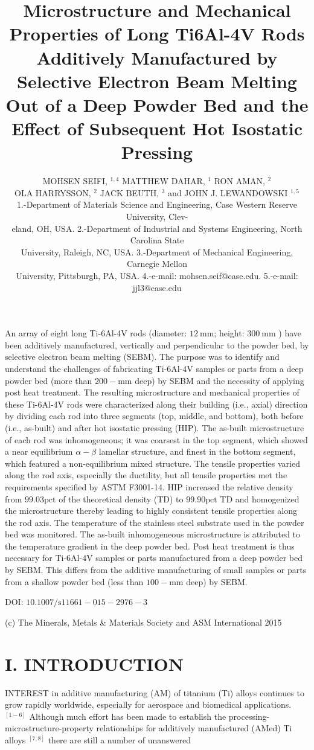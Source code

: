 \documentclass[10pt]{article}
\title{Microstructure and Mechanical Properties of Long Ti6Al-4V Rods Additively Manufactured by Selective Electron Beam Melting Out of a Deep Powder Bed and the Effect of Subsequent Hot Isostatic Pressing }
\author{MOHSEN SEIFI, ${ }^{1,4}$ MATTHEW DAHAR, ${ }^{1}$ RON AMAN, ${ }^{2}$\\
OLA HARRYSSON, ${ }^{2}$ JACK BEUTH, ${ }^{3}$ and JOHN J. LEWANDOWSKI ${ }^{1,5}$\\
1.-Department of Materials Science and Engineering, Case Western Reserve University, Clev-\\
eland, OH, USA. 2.-Department of Industrial and Systems Engineering, North Carolina State\\
University, Raleigh, NC, USA. 3.-Department of Mechanical Engineering, Carnegie Mellon\\
University, Pittsburgh, PA, USA. 4.-e-mail: mohsen.seif@case.edu. 5.-e-mail: jjl3@case.edu}
\date{}
\begin{document}
\maketitle
An array of eight long Ti-6Al-4V rods (diameter: $12 \mathrm{~mm}$; height: $300 \mathrm{~mm}$ ) have been additively manufactured, vertically and perpendicular to the powder bed, by selective electron beam melting (SEBM). The purpose was to identify and understand the challenges of fabricating Ti-6Al-4V samples or parts from a deep powder bed (more than $200-\mathrm{mm}$ deep) by SEBM and the necessity of applying post heat treatment. The resulting microstructure and mechanical properties of these Ti-6Al-4V rods were characterized along their building (i.e., axial) direction by dividing each rod into three segments (top, middle, and bottom), both before (i.e., as-built) and after hot isostatic pressing (HIP). The as-built microstructure of each rod was inhomogeneous; it was coarsest in the top segment, which showed a near equilibrium $\alpha-\beta$ lamellar structure, and finest in the bottom segment, which featured a non-equilibrium mixed structure. The tensile properties varied along the rod axis, especially the ductility, but all tensile properties met the requirements specified by ASTM F3001-14. HIP increased the relative density from $99.03 \mathrm{pct}$ of the theoretical density (TD) to $99.90 \mathrm{pct}$ TD and homogenized the microstructure thereby leading to highly consistent tensile properties along the rod axis. The temperature of the stainless steel substrate used in the powder bed was monitored. The as-built inhomogeneous microstructure is attributed to the temperature gradient in the deep powder bed. Post heat treatment is thus necessary for Ti-6Al-4V samples or parts manufactured from a deep powder bed by SEBM. This differs from the additive manufacturing of small samples or parts from a shallow powder bed (less than $100-\mathrm{mm}$ deep) by SEBM.

DOI: $10.1007 / \mathrm{s} 11661-015-2976-3$

(c) The Minerals, Metals \& Materials Society and ASM International 2015

\section*{I. INTRODUCTION}
INTEREST in additive manufacturing (AM) of titanium (Ti) alloys continues to grow rapidly worldwide, especially for aerospace and biomedical applications. ${ }^{[1-6]}$ Although much effort has been made to establish the processing-microstructure-property relationships for additively manufactured (AMed) Ti alloys ${ }^{[7,8]}$ there are still a number of unanswered
\end{document}
